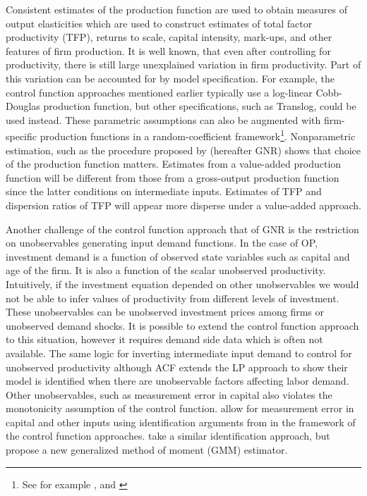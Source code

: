 \documentclass{article}
\begin{document}
Consistent estimates of the production function are used to obtain measures of output elasticities which are used to construct estimates of total factor productivity (TFP), returns to scale, capital intensity, mark-ups, and other features of firm production. It is well known, that even after controlling for productivity, there is still large unexplained variation in firm productivity. Part of this variation can be accounted for by model specification. For example, the control function approaches mentioned earlier typically use a log-linear Cobb-Douglas production function, but other specifications, such as Translog, could be used instead. These parametric assumptions can also be augmented with firm-specific production functions in a random-coefficient framework\footnote{See for example \cite{Kasahara2015}, \cite{balat} and \cite{Li2017}}. Nonparametric estimation, such as the procedure proposed by \cite{Gandhi2020} (hereafter GNR) shows that choice of the production function matters. Estimates from a value-added production function will be different from those from a gross-output production function since the latter conditions on intermediate inputs. Estimates of TFP and dispersion ratios of TFP will appear more disperse under a value-added approach.

Another challenge of the control function approach that of GNR is the restriction on unobservables generating input demand functions. In the case of OP, investment demand is a function of observed state variables such as capital and age of the firm. It is also a function of the scalar unobserved productivity. Intuitively, if the investment equation depended on other unobservables we would not be able to infer values of productivity from different levels of investment. These unobservables can be unobserved investment prices among firms or unobserved demand shocks. It is possible to extend the control function approach to this situation, however it requires demand side data which is often not available. The same logic for inverting intermediate input demand to control for unobserved productivity although ACF extends the LP approach to show their model is identified when there are unobservable factors affecting labor demand. Other unobservables, such as measurement error in capital also violates the monotonicity assumption of the control function. \cite{song} allow for measurement error in capital and other inputs using identification arguments from \cite{Hu2008} in the framework of the control function approaches. \cite{Hu2019} take a similar identification approach, but propose a new generalized method of moment (GMM) estimator. 
\end{document}
